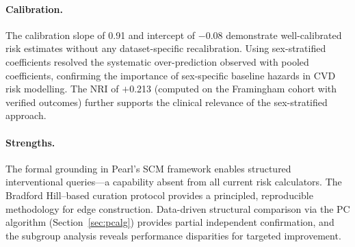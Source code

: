 \documentclass[runningheads]{llncs}
\begin{document}
\paragraph{Calibration.}
The calibration slope of 0.91 and intercept of $-$0.08 demonstrate
well-calibrated risk estimates without any dataset-specific
recalibration.  Using sex-stratified coefficients resolved the
systematic over-prediction observed with pooled coefficients,
confirming the importance of sex-specific baseline hazards in CVD
risk modelling.  The NRI of $+$0.213 (computed on the Framingham
cohort with verified outcomes) further supports the clinical
relevance of the sex-stratified approach.

\paragraph{Strengths.}
The formal grounding in Pearl's SCM framework enables structured
interventional queries---a capability absent from all current risk
calculators.  The Bradford Hill--based curation
protocol provides a principled, reproducible methodology for edge
construction.  Data-driven structural comparison via the PC algorithm
(Section~\ref{sec:pcalg}) provides partial independent confirmation,
and the subgroup analysis reveals performance
disparities for targeted improvement.
\end{document}
